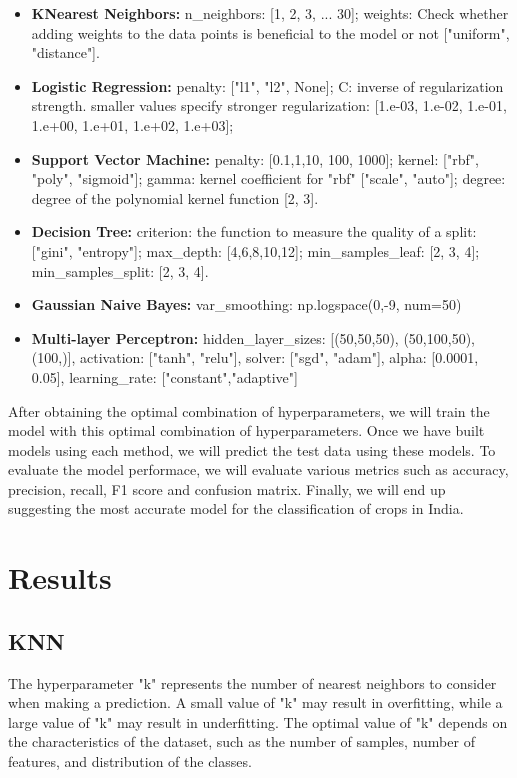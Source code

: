 \documentclass{article}
\begin{document}
\begin{itemize}

\item {\bf K\-Nearest Neighbors:} n\_neighbors: [1, 2, 3, ... 30]; weights: Check whether adding weights to the data points is beneficial to the model or not ["uniform", "distance"].
\item {\bf Logistic Regression:} penalty: ["l1", "l2", None]; C: inverse of regularization strength. smaller values specify stronger regularization: [1.e-03, 1.e-02, 1.e-01, 1.e+00, 1.e+01, 1.e+02, 1.e+03]; 
\item {\bf Support Vector Machine:} penalty: [0.1,1,10, 100, 1000]; kernel: ["rbf", "poly", "sigmoid"]; gamma: kernel coefficient for "rbf" ["scale", "auto"]; degree: degree of the polynomial kernel function [2, 3].
\item {\bf Decision Tree:} criterion: the function to measure the quality of a split: ["gini", "entropy"]; max\_depth: [4,6,8,10,12]; min\_samples\_leaf: [2, 3, 4]; min\_samples\_split: [2, 3, 4].
\item {\bf Gaussian Naive Bayes:} var\_smoothing: np.logspace(0,-9, num=50)
\item {\bf Multi-layer Perceptron:} hidden\_layer\_sizes: [(50,50,50), (50,100,50), (100,)], activation: ["tanh", "relu"], solver: ["sgd", "adam"], alpha: [0.0001, 0.05], learning\_rate: ["constant","adaptive"]

\end{itemize}

After obtaining the optimal combination of hyperparameters, we will train the model with this optimal combination of hyperparameters. Once we have built models using each method, we will predict the test data using these models. To evaluate the model performace, we will evaluate various metrics such as accuracy, precision, recall, F1 score and confusion matrix. Finally, we will end up suggesting the most accurate model for the classification of crops in India.


\section{Results}

\subsection{KNN}

The hyperparameter "k" represents the number of nearest neighbors to consider when making a prediction. A small value of "k" may result in overfitting, while a large value of "k" may result in underfitting. The optimal value of "k" depends on the characteristics of the dataset, such as the number of samples, number of features, and distribution of the classes.
\end{document}

